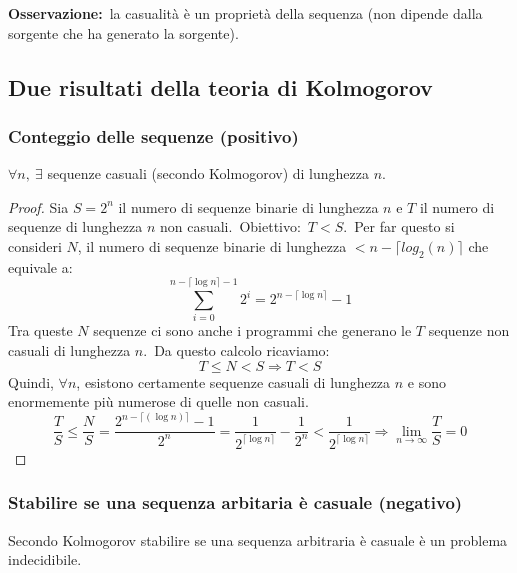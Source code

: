 \noindent \textbf{Osservazione:}\ la casualità è un proprietà della sequenza (non dipende dalla sorgente che ha generato la sorgente).\

\subsection{Due risultati della teoria di Kolmogorov}

\subsubsection{Conteggio delle sequenze (positivo)}

\begin{center}
    $\forall n,\ \exists$ sequenze casuali (secondo Kolmogorov) di lunghezza $n$.
\end{center}

\begin{proof}
    Sia $S= 2^n$ il numero di sequenze binarie di lunghezza $n$ e $T$ il numero di sequenze di lunghezza $n$ non casuali.\
    Obiettivo:\ $T < S$.\
    Per far questo si consideri $N$, il numero di sequenze binarie di lunghezza $< n - \lceil log_2 (n)\rceil$ che equivale a:
    \[\sum_{i=0}^{n - \lceil \log n\rceil -1} 2^i = 2^{n- \lceil \log n\rceil} -1\]
    Tra queste $N$ sequenze ci sono anche i programmi che generano le $T$ sequenze non casuali di lunghezza $n$.\
    Da questo calcolo ricaviamo: \[T \leq N < S \Rightarrow T < S\]
    Quindi, $\forall n$, esistono certamente sequenze casuali di lunghezza $n$ e sono enormemente più numerose di quelle non casuali.\
    \[\frac{T}{S} \leq \frac{N}{S} = \frac{2^{n-\lceil(\log n)\rceil}-1}{2^n} = \frac{1}{2^{\lceil\log n\rceil}} - \frac{1}{2^n} < \frac{1}{2^{\lceil\log n\rceil}} \Rightarrow \lim_{n\to\infty} \frac{T}{S} = 0\]

\end{proof}

\subsubsection{Stabilire se una sequenza arbitaria è casuale (negativo)}

Secondo Kolmogorov stabilire se una sequenza arbitraria è casuale è un problema indecidibile.\


